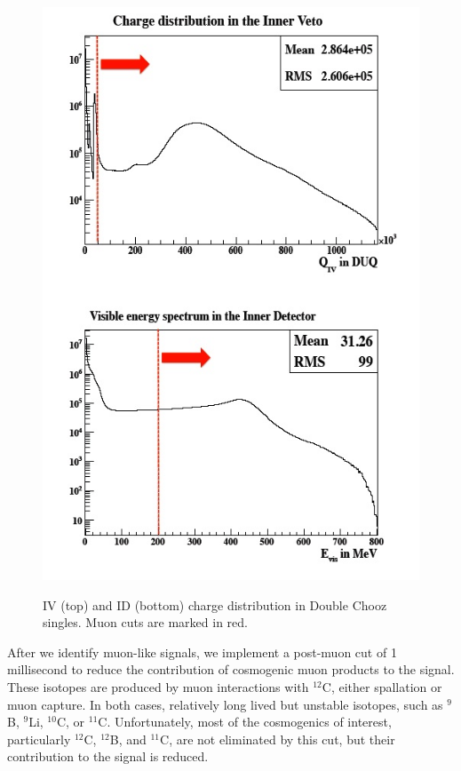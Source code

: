   \begin{figure}
  \caption{IV (top) and ID (bottom) charge distribution in Double Chooz singles. Muon cuts are marked in red.}
  \includegraphics[height=.9 \textheight]{Paraphotons/Muon_Cuts.jpg}
  \label{Muon_Cuts}
  \end{figure}

After we identify muon-like signals, we implement a post-muon cut of 1 millisecond to reduce the contribution of cosmogenic muon products to the signal. These isotopes are produced by muon interactions with $^{12}$C, either spallation or muon capture. In both cases, relatively long lived but unstable isotopes, such as $^{9}$B, $^{9}$Li, $^{10}$C, or $^{11}$C. Unfortunately, most of the cosmogenics of interest, particularly $^{12}$C, $^{12}$B, and $^{11}$C, are not eliminated by this cut, but their contribution to the signal is reduced. 

